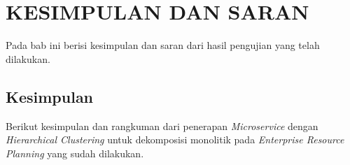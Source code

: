 \chapter{KESIMPULAN DAN SARAN}

\vspace{4.5pt}
Pada bab ini berisi kesimpulan dan saran dari hasil pengujian yang telah dilakukan.  


\section{Kesimpulan}
Berikut kesimpulan dan rangkuman dari penerapan \textit{Microservice} dengan \textit{Hierarchical Clustering} untuk dekomposisi monolitik pada \textit{Enterprise Resource Planning} yang sudah dilakukan.

